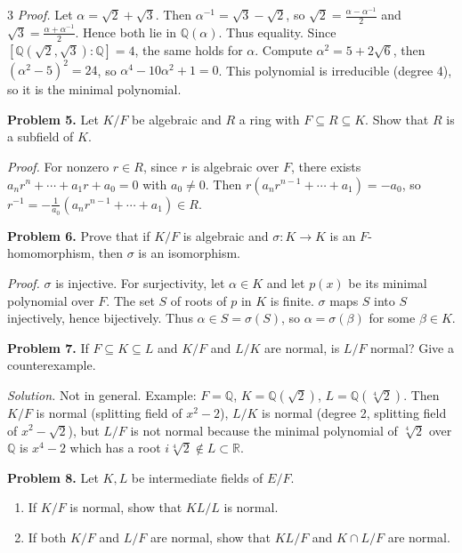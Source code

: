 \documentclass[10pt,landscape]{article}
\begin{document}
\begin{multicols}{3}
\textit{Proof.} Let \(\alpha=\sqrt2+\sqrt3\). Then \(\alpha^{-1}=\sqrt3-\sqrt2\), so \(\sqrt2=\frac{\alpha-\alpha^{-1}}{2}\) and \(\sqrt3=\frac{\alpha+\alpha^{-1}}{2}\). Hence both lie in \(\mathbb{Q}(\alpha)\). Thus equality. Since \([\mathbb{Q}(\sqrt2,\sqrt3):\mathbb{Q}]=4\), the same holds for \(\alpha\). Compute \(\alpha^2=5+2\sqrt6\), then \((\alpha^2-5)^2=24\), so \(\alpha^4-10\alpha^2+1=0\). This polynomial is irreducible (degree 4), so it is the minimal polynomial.

\noindent\textbf{Problem 5.} Let \(K/F\) be algebraic and \(R\) a ring with \(F\subseteq R\subseteq K\). Show that \(R\) is a subfield of \(K\).

\textit{Proof.} For nonzero \(r\in R\), since \(r\) is algebraic over \(F\), there exists \(a_nr^n+\cdots+a_1r+a_0=0\) with \(a_0\neq0\). Then \(r(a_nr^{n-1}+\cdots+a_1)=-a_0\), so \(r^{-1}=-\frac1{a_0}(a_nr^{n-1}+\cdots+a_1)\in R\). 

\noindent\textbf{Problem 6.} Prove that if \(K/F\) is algebraic and \(\sigma:K\to K\) is an \(F\)-homomorphism, then \(\sigma\) is an isomorphism.

\textit{Proof.} \(\sigma\) is injective. For surjectivity, let \(\alpha\in K\) and let \(p(x)\) be its minimal polynomial over \(F\). The set \(S\) of roots of \(p\) in \(K\) is finite. \(\sigma\) maps \(S\) into \(S\) injectively, hence bijectively. Thus \(\alpha\in S=\sigma(S)\), so \(\alpha=\sigma(\beta)\) for some \(\beta\in K\). 

\noindent\textbf{Problem 7.} If \(F\subseteq K\subseteq L\) and \(K/F\) and \(L/K\) are normal, is \(L/F\) normal? Give a counterexample.

\textit{Solution.} Not in general. Example: \(F=\mathbb{Q}\), \(K=\mathbb{Q}(\sqrt2)\), \(L=\mathbb{Q}(\sqrt[4]{2})\). Then \(K/F\) is normal (splitting field of \(x^2-2\)), \(L/K\) is normal (degree 2, splitting field of \(x^2-\sqrt2\)), but \(L/F\) is not normal because the minimal polynomial of \(\sqrt[4]{2}\) over \(\mathbb{Q}\) is \(x^4-2\) which has a root \(i\sqrt[4]{2}\notin L\subset\mathbb{R}\). 

\noindent\textbf{Problem 8.} Let \(K,L\) be intermediate fields of \(E/F\).
\begin{enumerate}
\item If \(K/F\) is normal, show that \(KL/L\) is normal.
\item If both \(K/F\) and \(L/F\) are normal, show that \(KL/F\) and \(K\cap L/F\) are normal.
\end{enumerate}


\end{multicols}
\end{document}
